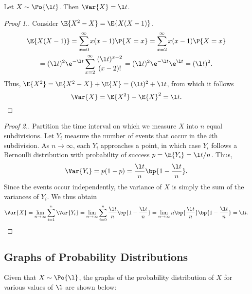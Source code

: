 \begin{proposition}
    Let $X \sim \Po{\l t}$. Then $\Var{X} = \l t$.
\end{proposition}
\begin{proof}[Proof 1.]
    Consider $\E{X^2 - X} = \E{X(X-1)}$.
    \begin{gather*}
        \E{X(X-1)} = \sum_{x = 0}^\infty x(x-1) \P{X = x} = \sum_{x = 2}^\infty x(x-1)\P{X = x}\\
        = (\l t)^2 \e^{-\l t} \sum_{x = 2}^\infty \frac{(\l t)^{x-2}}{(x-2)!} = (\l t)^2 \e^{-\l t} \e^{\l t} = (\l t)^2.
    \end{gather*}
    Thus, $\E{X^2} = \E{X^2 - X} + \E{X} = (\l t)^2 + \l t$, from which it follows \[\Var{X} = \E{X^2} - \E{X}^2 = \l t.\]
\end{proof}
\begin{proof}[Proof 2.]
    Partition the time interval on which we measure $X$ into $n$ equal subdivisions. Let $Y_i$ measure the number of events that occur in the $i$th subdivision. As $n \to \infty$, each $Y_i$ approaches a point, in which case $Y_i$ follows a Bernoulli distribution with probability of success $p = \E{Y_i} = \l t / n$. Thus, \[\Var{Y_i} = p(1-p) = \frac{\l t}n \bp{1 - \frac{\l t}n}.\] Since the events occur independently, the variance of $X$ is simply the sum of the variances of $Y_i$. We thus obtain \[\Var{X} = \lim_{n \to \infty} \sum_{i = 1}^n \Var{Y_i} = \lim_{n \to \infty} \sum_{i = 0}^n \frac{\l t}n \bp{1 - \frac{\l t}n} = \lim_{n \to \infty} n\bp{\frac{\l t}{n}}\bp{1 - \frac{\l t}{n}} = \l t.\]
\end{proof}

\subsection{Graphs of Probability Distributions}

Given that $X \sim \Po{\l}$, the graphs of the probability distribution of $X$ for various values of $\l$ are shown below:

